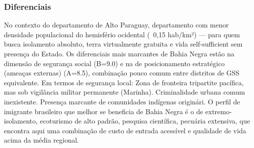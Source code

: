 \subsubsection*{Diferenciais}\label{dif-bahia-negra-1704}
No contexto do departamento de Alto Paraguay, departamento com menor densidade populacional do hemisfério ocidental (~0,15 hab/km²) — para quem busca isolamento absoluto, terra virtualmente gratuita e vida self-sufficient sem presença do Estado. Os diferenciais mais marcantes de Bahia Negra estão na dimensão de segurança social (B=9.0) e na de posicionamento estratégico (ameaças externas) (A=8.5), combinação pouco comum entre distritos de GSS equivalente. Em termos de segurança local: Zona de fronteira tripartite pacífica, mas sob vigilância militar permanente (Marinha). Criminalidade urbana comum inexistente. Presença marcante de comunidades indígenas originári. O perfil de imigrante brasileiro que melhor se beneficia de Bahia Negra é o de extremo-isolamento, ecoturismo de alto padrão, pesquisa científica, pecuária extensiva, que encontra aqui uma combinação de custo de entrada acessível e qualidade de vida acima da média regional.
